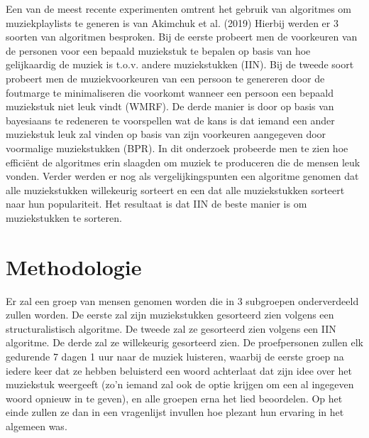 Een van de meest recente experimenten omtrent het gebruik van algoritmes om muziekplaylists te generen is van Akimchuk et al. (2019) Hierbij werden er 3 soorten van algoritmen besproken. Bij de eerste probeert men de voorkeuren van de personen voor een bepaald muziekstuk te bepalen op basis van hoe gelijkaardig de muziek is t.o.v. andere muziekstukken (IIN). Bij de tweede soort probeert men de muziekvoorkeuren van een persoon te genereren door de foutmarge te minimaliseren die voorkomt wanneer een persoon een bepaald muziekstuk niet leuk vindt (WMRF). De derde manier is door op basis van bayesiaans te redeneren te voorspellen wat de kans is dat iemand een ander muziekstuk leuk zal vinden op basis van zijn voorkeuren aangegeven door voormalige muziekstukken (BPR). In dit onderzoek probeerde men te zien hoe efficiënt de algoritmes erin slaagden om muziek te produceren die de mensen leuk vonden. Verder werden er nog als vergelijkingspunten een algoritme genomen dat alle muziekstukken willekeurig sorteert en een dat alle muziekstukken sorteert naar hun populariteit. Het resultaat is dat IIN de beste manier is om muziekstukken te sorteren. 


\section{Methodologie}
\label{sec:methodologie}

Er zal een groep van mensen genomen worden die in 3 subgroepen onderverdeeld zullen worden. De eerste zal zijn muziekstukken gesorteerd zien volgens een structuralistisch algoritme. De tweede zal ze gesorteerd zien volgens een IIN algoritme. De derde zal ze willekeurig gesorteerd zien. De proefpersonen zullen elk gedurende 7 dagen 1 uur naar de muziek luisteren, waarbij de eerste groep na iedere keer dat ze hebben beluisterd een woord achterlaat dat zijn idee over het muziekstuk weergeeft (zo'n iemand zal ook de optie krijgen om een al ingegeven woord opnieuw in te geven), en alle groepen erna het lied beoordelen. Op het einde zullen ze dan in een vragenlijst invullen hoe plezant hun ervaring in het algemeen was. 

